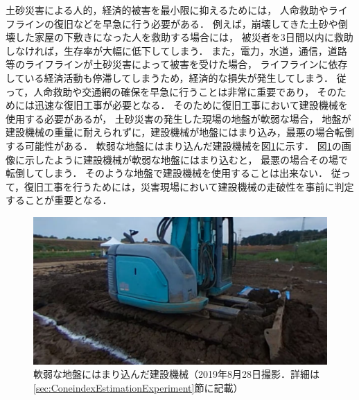 土砂災害による人的，経済的被害を最小限に抑えるためには，
人命救助やライフラインの復旧などを早急に行う必要がある\cite{国交省2016}．
例えば，崩壊してきた土砂や倒壊した家屋の下敷きになった人を救助する場合には，
被災者を3日間以内に救助しなければ，生存率が大幅に低下してしまう\cite{国交省2002}\cite{生田2005}\cite{田畑2006}．
また，電力，水道，通信，道路等のライフラインが土砂災害によって被害を受けた場合，
ライフラインに依存している経済活動も停滞してしまうため，経済的な損失が発生してしまう\cite{豊田2008}\cite{豊田2010}．
従って，人命救助や交通網の確保を早急に行うことは非常に重要であり，
そのためには迅速な復旧工事が必要となる\cite{国交省2016}．
そのために復旧工事において建設機械を使用する必要があるが，
土砂災害の発生した現場の地盤が軟弱な場合，
地盤が建設機械の重量に耐えられずに，建設機械が地盤にはまり込み，最悪の場合転倒する可能性がある\cite{玉手2008}\cite{玉手2014}．
軟弱な地盤にはまり込んだ建設機械を図\ref{fig:sinking_construnction_machine}に示す．
図\ref{fig:sinking_construnction_machine}の画像に示したように建設機械が軟弱な地盤にはまり込むと，
最悪の場合その場で転倒してしまう．
そのような地盤で建設機械を使用することは出来ない．
従って，復旧工事を行うためには，災害現場において建設機械の走破性を事前に判定することが重要となる．

\begin{figure}[b]
	\begin{center}
	\includegraphics[width=13cm]{./Ch1_Introduction/Fig/trafficability_coneindex_72_72_compressed.pdf}
	\caption{軟弱な地盤にはまり込んだ建設機械（2019年8月28日撮影．詳細は\ref{sec:ConeindexEstimationExperiment}節に記載）}\label{fig:sinking_construnction_machine}
	\vspace{1cm} %
	\end{center}
\end{figure}



